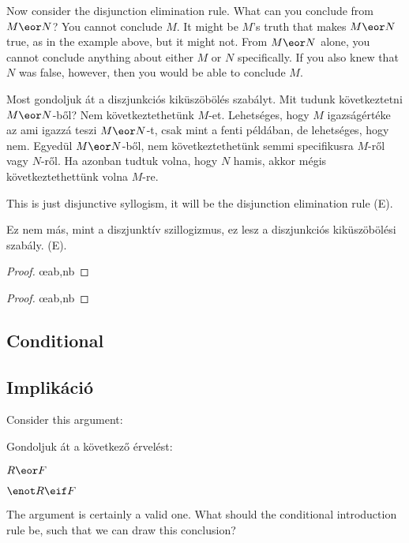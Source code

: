 Now consider the disjunction elimination rule. What can you conclude from $M \eor N$? You cannot conclude $M$. It might be $M$'s truth that makes $M \eor N$ true, as in the example above, but it might not. From $M \eor N$ alone, you cannot conclude anything about either $M$ or $N$ specifically. If you also knew that $N$ was false, however, then you would be able to conclude $M$.

Most gondoljuk át a diszjunkciós kiküszöbölés szabályt. Mit tudunk következtetni $M \eor N$-ből? Nem következtethetünk $M$-et. Lehetséges, hogy $M$ igazságértéke az ami igazzá teszi $M \eor N$-t, csak mint a fenti példában, de lehetséges, hogy nem. Egyedül $M \eor N$-ből, nem következtethetünk semmi specifikusra  $M$-ről vagy $N$-ről. Ha azonban tudtuk volna, hogy $N$ hamis, akkor mégis következtethettünk volna $M$-re.

This is just disjunctive syllogism, it will be the disjunction elimination rule ({\eor}E).

Ez nem más, mint a diszjunktív szillogizmus, ez lesz a diszjunkciós kiküszöbölési szabály. ({\eor}E).
\begin{multicols}{2}
\begin{proof}
	 \oe{ab,nb}
\end{proof}

\begin{proof}
	 \oe{ab,nb}
\end{proof}

\end{multicols}

\subsection*{Conditional}
\subsection{Implikáció}

Consider this argument:

Gondoljuk át a következő érvelést:
\begin{earg}
\item[] $R \eor F$
\item[\therefore] $\enot R \eif F$
\end{earg}
The argument is certainly a valid one. What should the conditional introduction rule be, such that we can draw this conclusion?

